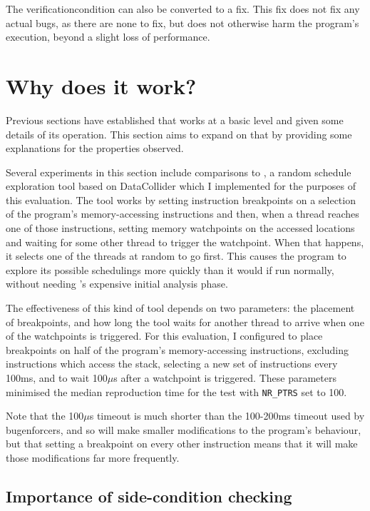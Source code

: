 The \gls{verificationcondition} can also be converted to a fix.  This
fix does not fix any actual bugs, as there are none to fix, but does
not otherwise harm the program's execution, beyond a slight loss of
performance.

\section{Why does it work?}
\label{sect:eval:why_does_it_work}

Previous sections have established that {\technique} works at a basic
level and given some details of its operation.  This section aims to
expand on that by providing some explanations for the properties
observed.

Several experiments in this section include comparisons to
{\randsched}, a random schedule exploration tool based on
DataCollider\cite{Erickson2010} which I implemented for the purposes
of this evaluation.  The tool works by setting instruction breakpoints
on a selection of the program's memory-accessing instructions and
then, when a thread reaches one of those instructions, setting memory
watchpoints on the accessed locations and waiting for some other
thread to trigger the watchpoint.  When that happens, it selects one
of the threads at random to go first.  This causes the program to
explore its possible schedulings more quickly than it would if run
normally, without needing {\technique}'s expensive initial analysis
phase.

The effectiveness of this kind of tool depends on two parameters: the
placement of breakpoints, and how long the tool waits for another
thread to arrive when one of the watchpoints is triggered.  For this
evaluation, I configured {\randsched} to place breakpoints on half of
the program's memory-accessing instructions, excluding instructions
which access the stack, selecting a new set of instructions every
100ms, and to wait 100$\mu$s after a watchpoint is triggered.  These
parameters minimised the median reproduction time for the
 test with \texttt{NR\_PTRS} set to 100.

Note that the 100$\mu$s timeout is much shorter than the 100-200ms
timeout used by {\technique} \glspl{bugenforcer}, and so {\randsched}
will make smaller modifications to the program's behaviour, but that
setting a breakpoint on every other instruction means that it will
make those modifications far more frequently.

\subsection{Importance of side-condition checking}

